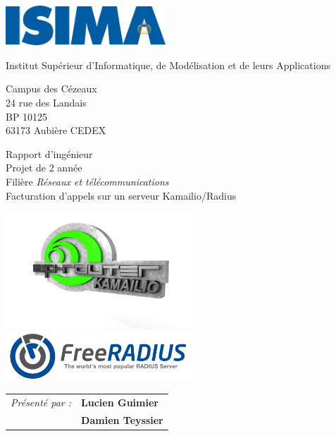 \thispagestyle{empty}

\includegraphics[width=6cm]{images/isima.png}

\vspace{0.5cm}

\begin{minipage}{4cm}
\begin{flushleft}
	Institut Supérieur d’Informatique, de Modélisation et de leurs Applications
	
	\vspace{0.5cm}
	
	\small{ Campus des Cézeaux \\ 24 rue des Landais \\ BP 10125 \\ 63173 Aubière CEDEX }
\end{flushleft}
\end{minipage}

\vspace{1cm}

\begin{center}
	Rapport d’ingénieur \\
	Projet de 2{\ieme} année \\
	Filière {\em{Réseaux et télécommunications}} \\
	\Large{Facturation d’appels sur un serveur Kamailio/Radius}
\end{center}

\vspace{0.5cm}

\begin{center}
\includegraphics[width=7cm, valign=m]{images/logo-kamailio.jpg}
\includegraphics[width=7cm, valign=m]{images/logo-freeradius.png}
\end{center}

\vspace{0.5cm}

\large{
\begin{tabular}{ll}
\textit{Présenté par :} & \textbf{Lucien Guimier} \\
& \textbf{Damien Teyssier}
\end{tabular}
}

\todo
